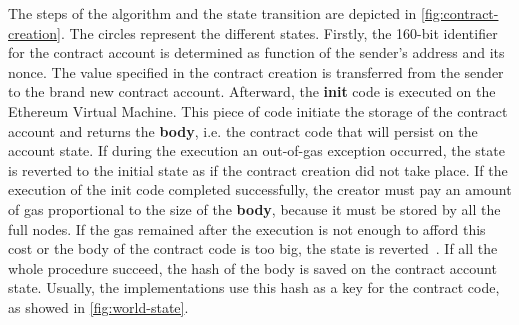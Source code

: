 The steps of the algorithm and the state transition are depicted in
\autoref{fig:contract-creation}. The circles represent the different states.
Firstly, the 160-bit identifier for the contract account is determined as
function of the sender's address and its nonce. The value specified in the
contract
creation is transferred from the sender to the brand new contract account.
Afterward, the \textbf{init} code is executed on the Ethereum Virtual Machine.
This  piece of code initiate the storage of the contract account and returns the
\textbf{body}, i.e. the contract code that will persist on the account state. If
during the execution an out-of-gas exception occurred, the state is reverted to
the initial state as if the contract creation did not take place. If the
execution of the init code completed successfully, the creator must pay an
amount of gas proportional to the size of the \textbf{body}, because it must be
stored by all the full nodes. If the gas remained after the execution is not
enough to afford this cost or the body of the contract code is too big, the
state is reverted~\cite{wood2018ethereum}. If all the whole procedure succeed,
the hash of the body is saved on the contract account state. Usually, the
implementations use this hash as a key for the contract code, as showed in
\autoref{fig:world-state}.


